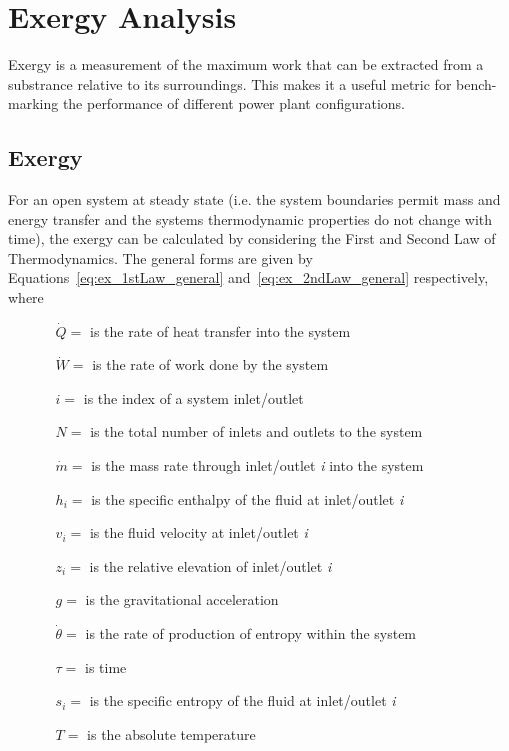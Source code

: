 \section{Exergy Analysis}
    Exergy is a measurement of the maximum work that can be extracted from a substrance relative to its surroundings. This makes it a useful metric for bench-marking the performance of different power plant configurations.

    \subsection{Exergy}
        For an open system at steady state (i.e. the system boundaries permit mass and energy transfer and the systems thermodynamic properties do not change with time), the exergy can be calculated by considering the First and Second Law of Thermodynamics. The general forms are given by Equations~\eqref{eq:ex_1stLaw_general} and~\eqref{eq:ex_2ndLaw_general} respectively, where
    
        \begin{itemize}
            \item[]
            \begin{enumerate}
                \item[\(\Dot{Q} = \)] is the rate of heat transfer into the system 
                \item[\(\Dot{W} = \)] is the rate of work done by the system
                \item[\(i = \)] is the index of a system inlet/outlet
                \item[\(N = \)] is the total number of inlets and outlets to the system
                \item[\(\Dot{m} = \)] is the mass rate through inlet/outlet \emph{i} into the system
                \item[\(h_i = \)] is the specific enthalpy of the fluid at inlet/outlet \emph{i}
                \item[\(v_i = \)] is the fluid velocity at inlet/outlet \emph{i}
                \item[\(z_i = \)] is the relative elevation of inlet/outlet \emph{i}
                \item[\(g = \)] is the gravitational acceleration
                \item[\(\Dot{\theta} = \)] is the rate of production of entropy within the system
                \item[\(\tau = \)] is time
                \item[\(s_i = \)] is the specific entropy of the fluid at inlet/outlet \emph{i}
                \item[\(T = \)] is the absolute temperature
            \end{enumerate}
        \end{itemize}
        
